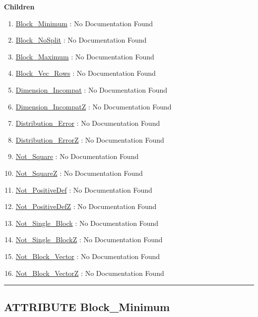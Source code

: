 \textbf{Children}
\begin{enumerate}
\item \hyperlink{ecldoc:pbblas.constants.block_minimum}{Block\_Minimum}
: No Documentation Found
\item \hyperlink{ecldoc:pbblas.constants.block_nosplit}{Block\_NoSplit}
: No Documentation Found
\item \hyperlink{ecldoc:pbblas.constants.block_maximum}{Block\_Maximum}
: No Documentation Found
\item \hyperlink{ecldoc:pbblas.constants.block_vec_rows}{Block\_Vec\_Rows}
: No Documentation Found
\item \hyperlink{ecldoc:pbblas.constants.dimension_incompat}{Dimension\_Incompat}
: No Documentation Found
\item \hyperlink{ecldoc:pbblas.constants.dimension_incompatz}{Dimension\_IncompatZ}
: No Documentation Found
\item \hyperlink{ecldoc:pbblas.constants.distribution_error}{Distribution\_Error}
: No Documentation Found
\item \hyperlink{ecldoc:pbblas.constants.distribution_errorz}{Distribution\_ErrorZ}
: No Documentation Found
\item \hyperlink{ecldoc:pbblas.constants.not_square}{Not\_Square}
: No Documentation Found
\item \hyperlink{ecldoc:pbblas.constants.not_squarez}{Not\_SquareZ}
: No Documentation Found
\item \hyperlink{ecldoc:pbblas.constants.not_positivedef}{Not\_PositiveDef}
: No Documentation Found
\item \hyperlink{ecldoc:pbblas.constants.not_positivedefz}{Not\_PositiveDefZ}
: No Documentation Found
\item \hyperlink{ecldoc:pbblas.constants.not_single_block}{Not\_Single\_Block}
: No Documentation Found
\item \hyperlink{ecldoc:pbblas.constants.not_single_blockz}{Not\_Single\_BlockZ}
: No Documentation Found
\item \hyperlink{ecldoc:pbblas.constants.not_block_vector}{Not\_Block\_Vector}
: No Documentation Found
\item \hyperlink{ecldoc:pbblas.constants.not_block_vectorz}{Not\_Block\_VectorZ}
: No Documentation Found
\end{enumerate}

\rule{\linewidth}{0.5pt}

\subsection*{\textsf{\colorbox{headtoc}{\color{white} ATTRIBUTE}
Block\_Minimum}}

